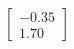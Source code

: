 \documentclass[preview]{standalone}
\begin{document}
\begin{align*}
\begin{bmatrix} -0.35 \\ 1.70 \end{bmatrix}
\end{align*}
\end{document}
